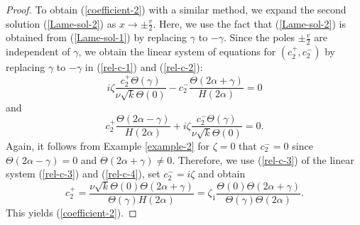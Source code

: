 \documentclass[10pt,a4paper]{amsart}
\begin{document}
\begin{proof}
To obtain (\ref{coefficient-2}) with a similar method, we expand the second solution (\ref{Lame-sol-2}) as $x \to \pm \frac{v}{2}$.  Here, we use the fact that (\ref{Lame-sol-2}) 
is obtained from (\ref{Lame-sol-1}) by replacing $\gamma$ to $-\gamma$. Since the poles $\pm \frac{v}{2}$ are independent of $\gamma$, we obtain the linear system of equations for $(c_2^+,c_2^-)$ by replacing $\gamma$ to $-\gamma$ in (\ref{rel-c-1}) and (\ref{rel-c-2}):
\begin{equation}
\label{rel-c-3}
i \zeta  \frac{c_2^+ \Theta(\gamma)}{\nu \sqrt{k} \Theta(0)} 
- c_2^- \frac{\Theta(2 \alpha + \gamma)}{H(2\alpha)} = 0
\end{equation}
and
\begin{equation}
\label{rel-c-4}
c_2^+ \frac{\Theta(2 \alpha - \gamma)}{H(2\alpha)} + i \zeta \frac{c_2^-  \Theta(\gamma)}{\nu \sqrt{k} \Theta(0)} = 0.
\end{equation}
Again, it follows from Example \ref{example-2} for $\zeta = 0$ that $c_2^- = 0$ since $\Theta(2\alpha - \gamma) = 0$ and $\Theta(2\alpha + \gamma) \neq 0$. 
Therefore, we use (\ref{rel-c-3}) of the linear system 
(\ref{rel-c-3}) and (\ref{rel-c-4}), set $c_2^- = i\zeta$ and obtain 
$$
c_2^+ = \frac{\nu \sqrt{k} \Theta(0) \Theta(2\alpha + \gamma)}{\Theta(\gamma) H(2\alpha)} = \zeta_1 \frac{\Theta(0) \Theta(2\alpha + \gamma)}{\Theta(\gamma) \Theta(2\alpha)}.
$$
This yields (\ref{coefficient-2}).
\end{proof}
\end{document}

